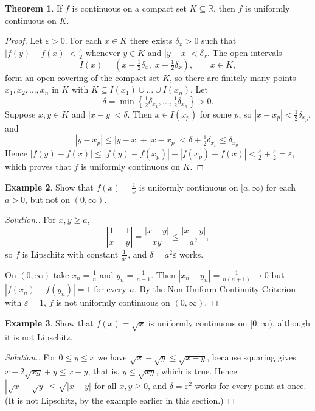 \documentclass[11pt,a4paper]{article}
\numberwithin{equation}{section}
\theoremstyle{definition}
\newtheorem{thm}{Theorem}[subsection]
\newtheorem{exa}[thm]{Example}
\newenvironment{solution}
  {\renewcommand{\qedsymbol}{}\begin{proof}[\textit{Solution}.]}
  {\end{proof}}
\begin{document}
\begin{thm}
If $f$ is continuous on a compact set $K\subseteq \mathbb{R}$, then $f$ is uniformly continuous on $K$.
\end{thm}

\begin{proof}
Let $\varepsilon>0$. For each $x\in K$ there exists $\delta_x > 0$ such that $|f(y) - f(x)| < \frac{\varepsilon}{2}$ whenever $y\in K$ and $|y - x| < \delta_x$. The open intervals
$$I(x) = \left(x - \tfrac{1}{2}\delta_x,\; x + \tfrac{1}{2}\delta_x\right), \qquad x\in K,$$
form an open covering of the compact set $K$, so there are finitely many points $x_1, x_2, \dots, x_n$ in $K$ with $K\subseteq I(x_1) \cup \dots \cup I(x_n)$. Let
$$\delta = \min\left\{\tfrac{1}{2}\delta_{x_1}, \dots, \tfrac{1}{2}\delta_{x_n}\right\}>0 .$$
Suppose $x, y\in K$ and $|x - y| < \delta$. Then $x\in I(x_p)$ for some $p$, so $|x - x_p|<\frac{1}{2}\delta_{x_p}$, and
$$|y - x_p| \leq |y - x| + |x - x_p| < \delta + \tfrac{1}{2}\delta_{x_p} \leq \delta_{x_p} .$$
Hence $|f(y) - f(x)|\leq |f(y) - f(x_p)| + |f(x_p) - f(x)| < \frac{\varepsilon}{2}+\frac{\varepsilon}{2} = \varepsilon$, which proves that $f$ is uniformly continuous on $K$.
\end{proof}

\begin{exa}
Show that $f(x) = \frac{1}{x}$ is uniformly continuous on $[a,\infty)$ for each $a>0$, but not on $(0,\infty)$.
\end{exa}

\begin{solution}
For $x,y\geq a$,
$$\left|\frac{1}{x} - \frac{1}{y}\right| = \frac{|x-y|}{xy}\leq\frac{|x-y|}{a^2},$$
so $f$ is Lipschitz with constant $\frac{1}{a^2}$, and $\delta = a^2\varepsilon$ works.

On $(0,\infty)$ take $x_n = \frac{1}{n}$ and $y_n = \frac{1}{n+1}$. Then $|x_n - y_n| = \frac{1}{n(n+1)}\longrightarrow0$ but $|f(x_n) - f(y_n)| = 1$ for every $n$. By the Non-Uniform Continuity Criterion with $\varepsilon = 1$, $f$ is not uniformly continuous on $(0,\infty)$.
\end{solution}

\begin{exa}
Show that $f(x) = \sqrt{x}$ is uniformly continuous on $[0,\infty)$, although it is not Lipschitz.
\end{exa}

\begin{solution}
For $0\leq y\leq x$ we have $\sqrt{x} - \sqrt{y}\leq\sqrt{x-y}$, because squaring gives $x - 2\sqrt{xy} + y\leq x - y$, that is, $y\leq\sqrt{xy}$, which is true. Hence $|\sqrt{x}-\sqrt{y}|\leq\sqrt{|x-y|}$ for all $x,y\geq0$, and $\delta = \varepsilon^2$ works for every point at once. (It is not Lipschitz, by the example earlier in this section.)
\end{solution}
\end{document}

